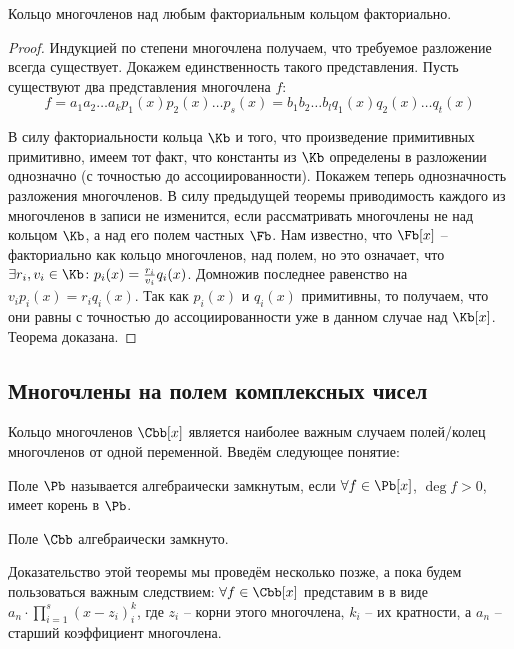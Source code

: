 \begin{theorem}
  Кольцо многочленов над любым факториальным кольцом факториально.
\end{theorem}
\begin{proof}
  Индукцией по степени многочлена получаем, что требуемое разложение всегда существует. Докажем единственность такого представления. Пусть существуют два представления многочлена $f$:
  $$f=a_1a_2\dots a_k p_1(x)p_2(x)\dots p_s(x)=b_1b_2\dots b_lq_1(x)q_2(x)\dots q_t(x)$$

  В силу факториальности кольца $\Kb$ и того, что произведение примитивных примитивно, имеем тот факт, что константы из $\Kb$ определены в разложении однозначно (с точностью до ассоциированности). Покажем теперь однозначность разложения многочленов. В силу предыдущей теоремы приводимость каждого из многочленов в записи не изменится, если рассматривать многочлены не над кольцом $\Kb$, а над его полем частных $\Fb$. Нам известно, что $\Fb[x]$ -- факториально как кольцо многочленов, над полем, но это означает, что $\exists r_i,v_i\in\Kb\colon p_i(x)=\frac{r_i}{v_i}q_i(x)$. Домножив последнее равенство на $v_ip_i(x)=r_iq_i(x)$. Так как $p_i(x)$ и $q_i(x)$ примитивны, то получаем, что они равны с точностью до ассоциированности уже в данном случае над $\Kb[x]$. Теорема доказана.
\end{proof}

\subsection{Многочлены на полем комплексных чисел}

Кольцо многочленов $\Cbb[x]$ является наиболее важным случаем полей/колец многочленов от одной переменной. Введём следующее понятие:

\begin{df}
  Поле $\Pb$ называется алгебраически замкнутым, если $\forall f\in\Pb[x]$, $\deg f>0$, имеет корень в $\Pb$.
\end{df}
\begin{theorem}
  Поле $\Cbb$ алгебраически замкнуто.
\end{theorem}

Доказательство этой теоремы мы проведём несколько позже, а пока будем пользоваться важным следствием: $\forall f\in\Cbb[x]$ представим в в виде $a_n\cdot\prod\limits_{i=1}^s(x-z_i)^k_i$, где $z_i$ -- корни этого многочлена, $k_i$ -- их кратности, а $a_n$ -- старший коэффициент многочлена.

